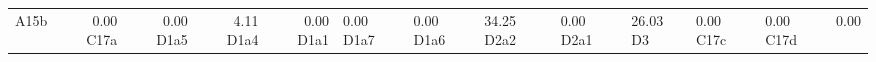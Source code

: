 \begin{tabular}{lrrrr}
A15b & 0.00%
C17a & 0.00%
D1a5 & 4.11%
D1a4 & 0.00%
D1a1 & 0.00%
D1a7 & 0.00%
D1a6 & 34.25%
D2a2 & 0.00%
D2a1 & 26.03%
D3 & 0.00%
C17c & 0.00%
C17d & 0.00%
\bottomrule
\end{tabular}
